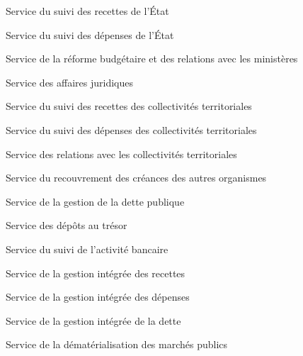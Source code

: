 \documentclass[a4paper,12pt,oneside]{report}
\begin{document}
{
\begin{svc}
\item Service du suivi des recettes de l'État
\item Service du suivi des dépenses de l'État
\item Service de la réforme budgétaire et des relations avec les ministères
\item Service des affaires juridiques
\end{svc}
\begin{svc}
\item Service du suivi des recettes des collectivités territoriales
\item Service du suivi des dépenses des collectivités territoriales
\item Service des relations avec les collectivités territoriales
\item Service du recouvrement des créances des autres organismes
\end{svc}
\begin{svc}
\item Service de la gestion de la dette publique
\item Service des dépôts au trésor
\item Service du suivi de l'activité bancaire
\end{svc}
\begin{svc}
\item Service de la gestion intégrée des recettes
\item Service de la gestion intégrée des dépenses
\item Service de la gestion intégrée de la dette
\item Service de la dématérialisation des marchés publics
\end{svc}

}
\end{document}
